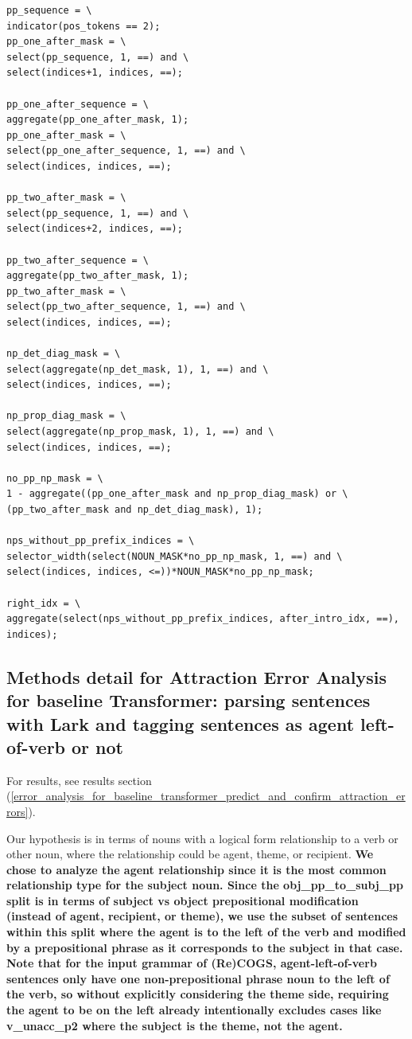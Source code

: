 \documentclass[11pt]{article}
\begin{document}
\begin{tiny}
\begin{verbatim}
pp_sequence = \
indicator(pos_tokens == 2);
pp_one_after_mask = \
select(pp_sequence, 1, ==) and \
select(indices+1, indices, ==);

pp_one_after_sequence = \
aggregate(pp_one_after_mask, 1);
pp_one_after_mask = \
select(pp_one_after_sequence, 1, ==) and \
select(indices, indices, ==);

pp_two_after_mask = \
select(pp_sequence, 1, ==) and \
select(indices+2, indices, ==);

pp_two_after_sequence = \
aggregate(pp_two_after_mask, 1);
pp_two_after_mask = \
select(pp_two_after_sequence, 1, ==) and \
select(indices, indices, ==);

np_det_diag_mask = \
select(aggregate(np_det_mask, 1), 1, ==) and \
select(indices, indices, ==);

np_prop_diag_mask = \
select(aggregate(np_prop_mask, 1), 1, ==) and \
select(indices, indices, ==);

no_pp_np_mask = \
1 - aggregate((pp_one_after_mask and np_prop_diag_mask) or \
(pp_two_after_mask and np_det_diag_mask), 1);

nps_without_pp_prefix_indices = \
selector_width(select(NOUN_MASK*no_pp_np_mask, 1, ==) and \
select(indices, indices, <=))*NOUN_MASK*no_pp_np_mask;

right_idx = \
aggregate(select(nps_without_pp_prefix_indices, after_intro_idx, ==), indices);
\end{verbatim}
\end{tiny}

\clearpage
\subsection{Methods detail for Attraction Error Analysis for \cite{Wu2023} baseline Transformer: parsing sentences with Lark and tagging sentences as agent left-of-verb or not  }
\label{appendix_error_analysis_for_baseline_transformer_methods}

For results, see results section (\ref{error_analysis_for_baseline_transformer_predict_and_confirm_attraction_errors}).

Our hypothesis is in terms of nouns with a logical form relationship to a verb or other noun, where the relationship could be agent, theme, or recipient.
\textbf{We chose to analyze the agent relationship since it is the most common relationship type for the subject noun. Since the obj\_pp\_to\_subj\_pp split is in terms of subject vs object prepositional modification (instead of agent, recipient, or theme), we use the subset of sentences within this split where the agent is to the left of the verb and modified by a prepositional phrase as it corresponds to the subject in that case. Note that for the input grammar of (Re)COGS, agent-left-of-verb sentences only have one non-prepositional phrase noun to the left of the verb, so without explicitly considering the theme side, requiring the agent to be on the left already intentionally excludes cases like v\_unacc\_p2 where the subject is the theme, not the agent.}
\end{document}
